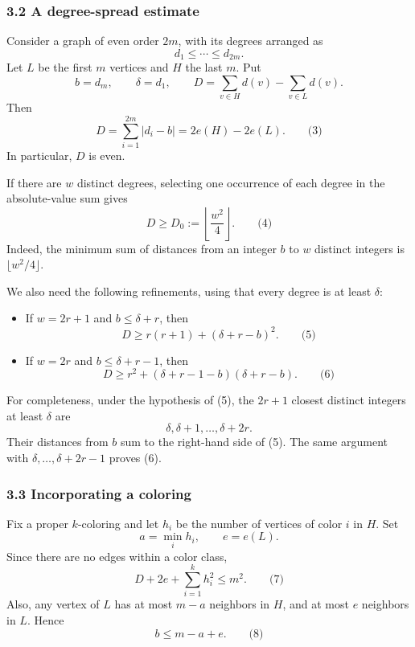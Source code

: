 \documentclass[
  11pt,
  a4paper,
]{article}
\providecommand{\tightlist}{%
  \setlength{\itemsep}{0pt}\setlength{\parskip}{0pt}}
\begin{document}
\subsubsection{3.2 A degree-spread
estimate}\label{a-degree-spread-estimate}

Consider a graph of even order \(2m\), with its degrees arranged as \[
d_1\le\cdots\le d_{2m}.
\] Let \(L\) be the first \(m\) vertices and \(H\) the last \(m\). Put
\[
b=d_m,\qquad \delta=d_1,\qquad
D=\sum_{v\in H}d(v)-\sum_{v\in L}d(v).
\] Then \[
D=\sum_{i=1}^{2m}|d_i-b|
   =2e(H)-2e(L). \qquad\text{(3)}
\] In particular, \(D\) is even.

If there are \(w\) distinct degrees, selecting one occurrence of each
degree in the absolute-value sum gives \[
D\ge D_0:=\left\lfloor\frac{w^2}{4}\right\rfloor. \qquad\text{(4)}
\] Indeed, the minimum sum of distances from an integer \(b\) to \(w\)
distinct integers is \(\lfloor w^2/4\rfloor\).

We also need the following refinements, using that every degree is at
least \(\delta\):

\begin{itemize}
\tightlist
\item
  If \(w=2r+1\) and \(b\le\delta+r\), then \[
  D\ge r(r+1)+(\delta+r-b)^2. \qquad\text{(5)}
  \]
\item
  If \(w=2r\) and \(b\le\delta+r-1\), then \[
  D\ge r^2+(\delta+r-1-b)(\delta+r-b). \qquad\text{(6)}
  \]
\end{itemize}

For completeness, under the hypothesis of (5), the \(2r+1\) closest
distinct integers at least \(\delta\) are \[
\delta,\delta+1,\ldots,\delta+2r.
\] Their distances from \(b\) sum to the right-hand side of (5). The
same argument with \(\delta,\ldots,\delta+2r-1\) proves (6).

\subsubsection{3.3 Incorporating a
coloring}\label{incorporating-a-coloring}

Fix a proper \(k\)-coloring and let \(h_i\) be the number of vertices of
color \(i\) in \(H\). Set \[
a=\min_i h_i,\qquad e=e(L).
\] Since there are no edges within a color class, \[
D+2e+\sum_{i=1}^k h_i^2\le m^2. \qquad\text{(7)}
\] Also, any vertex of \(L\) has at most \(m-a\) neighbors in \(H\), and
at most \(e\) neighbors in \(L\). Hence \[
b\le m-a+e. \qquad\text{(8)}
\]
\end{document}
